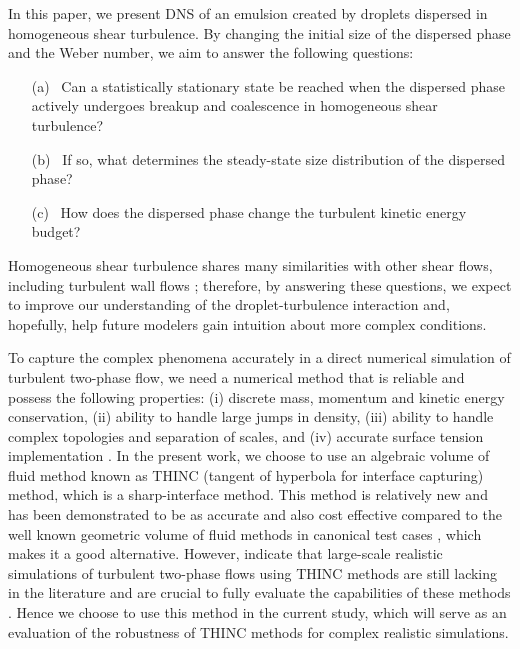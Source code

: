 In this paper, we present DNS of an emulsion created by droplets dispersed in homogeneous shear turbulence. By changing the initial size of the dispersed phase and the Weber number, we aim to answer the following questions:
\begin{enumerate}
\item[(a)] ~Can a statistically stationary state be reached when the dispersed phase actively undergoes breakup and coalescence in homogeneous shear turbulence?
\item[(b)] ~If so, what determines the steady-state size distribution of the dispersed phase?
\item[(c)] ~How does the dispersed phase change the turbulent kinetic energy budget?
\end{enumerate}
Homogeneous shear turbulence shares many similarities with other shear flows, including turbulent wall flows \citep{sekimoto_dong_jimenez_2016a}; therefore, by answering these questions, we expect to improve our understanding of the droplet-turbulence interaction and, hopefully, help future modelers gain intuition about more complex conditions. 

To capture the complex phenomena accurately in a direct numerical simulation of turbulent two-phase flow, we need a numerical method that is reliable and possess the following properties: (i) discrete mass, momentum and kinetic energy conservation, (ii) ability to handle large jumps in density, (iii) ability to handle complex topologies and separation of scales, and (iv) accurate surface tension implementation \citep{mirjalili_jain_dodd_2017a}. In the present work, we choose to use an algebraic volume of fluid method known as THINC (tangent of hyperbola for interface capturing) method, which is a sharp-interface method. This method is relatively new and has been demonstrated to be as accurate and also cost effective compared to the well known geometric volume of fluid methods in canonical test cases \citep{xie_ii_xiao_2014a}, which makes it a good alternative. However, \citet{mirjalili_jain_dodd_2017a} indicate that large-scale realistic simulations of turbulent two-phase flows using THINC methods are still lacking in the literature and are crucial to fully evaluate the capabilities of these methods \citep[see][for the use of the THINC method for low Reynolds number flows]{rosti_de-vita_brandt_2019a}. Hence we choose to use this method in the current study, which will serve as an evaluation of the robustness of THINC methods for complex realistic simulations. 

